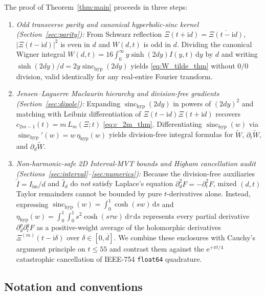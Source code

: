 \documentclass[11pt,a4paper,reqno]{amsart}
\theoremstyle{definition}
\theoremstyle{remark}
\numberwithin{equation}{section}
\newcommand{\dd}{\mathrm{d}}
\newcommand{\ii}{\mathrm{i}}
\newcommand{\ee}{\mathrm{e}}
\newcommand{\Wtil}{\widetilde{W}}
\newcommand{\sinch}{\operatorname{sinc}_{\mathrm{hyp}}}
\newcommand{\etah}{\eta_{\mathrm{hyp}}}
\begin{document}
The proof of Theorem~\ref{thm:main} proceeds in three steps:
\begin{enumerate}
\item \emph{Odd transverse parity and canonical hyperbolic-sinc kernel (Section~\ref{sec:parity}):} From Schwarz reflection $\Xi(t+\ii d) = \overline{\Xi(t-\ii d)}$, $|\Xi(t-\ii d)|^2$ is even in $d$ and $W(d,t)$ is odd in $d$. Dividing the canonical Wigner integral $W(d,t) = 16\int_0^\infty y\sinh(2dy)I(y,t)\,\dd y$ \cite{Missiaen2026Paper1} by $d$ and writing $\sinh(2dy)/d = 2y\sinch(2dy)$ yields \eqref{eq:W_tilde_thm} without $0/0$ division, valid identically for any real-entire Fourier transform.
\item \emph{Jensen--Laguerre Maclaurin hierarchy and division-free gradients (Section~\ref{sec:dipole}):} Expanding $\sinch(2dy)$ in powers of $(2dy)^2$ and matching with Leibniz differentiation of $\Xi(t-\ii d)\Xi(t+\ii d)$ recovers $c_{2m-1}(t) = m\,L_m(\Xi;t)$ \eqref{eq:c_2m_thm}. Differentiating $\sinch(w)$ via $\sinch'(w) = w\,\etah(w)$ yields division-free integral formulas for $\Wtil$, $\partial_t\Wtil$, and $\partial_d\Wtil$.
\item \emph{Non-harmonic-safe 2D Interval-MVT bounds and Higham cancellation audit (Sections~\ref{sec:interval}--\ref{sec:numerics}):} Because the division-free auxiliaries $\widetilde{I} = I_{\mathrm{im}}/d$ and $\widehat{I}_d$ do \emph{not} satisfy Laplace's equation $\partial_d^2 F = -\partial_t^2 F$, mixed $(d,t)$ Taylor remainders cannot be bounded by pure $t$-derivatives alone. Instead, expressing $\sinch(w) = \int_0^1 \cosh(sw)\,\dd s$ and $\etah(w) = \int_0^1\int_0^1 s^2\cosh(s\tau w)\,\dd\tau\,\dd s$ represents every partial derivative $\partial_d^p\partial_t^q F$ as a positive-weight average of the holomorphic derivatives $\Xi^{(m)}(t - \ii\delta)$ over $\delta \in [0, \overline{d}]$. We combine these enclosures with Cauchy's argument principle on $t \le 55$ and contrast them against the $\ee^{+\pi t/4}$ catastrophic cancellation of IEEE-754 \texttt{float64} quadrature.
\end{enumerate}

\subsection{Notation and conventions}\label{subsec:notation}
\end{document}
